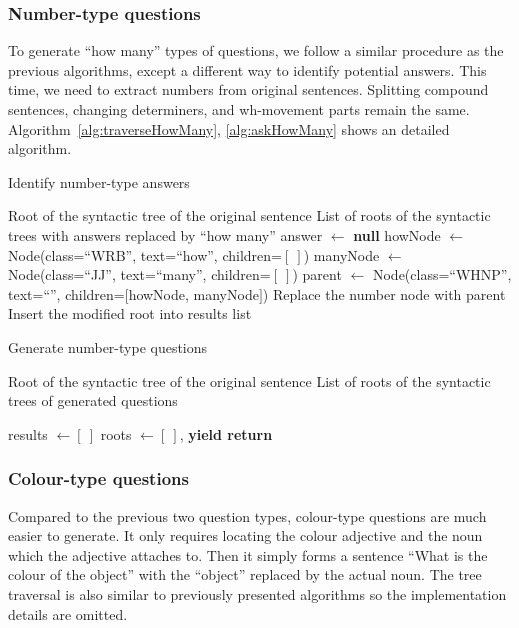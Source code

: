 \subsubsection{Number-type questions}
To generate ``how many'' types of questions, we follow a similar procedure as the previous algorithms, except a different way to identify potential answers. This time, we need to extract numbers from original sentences. Splitting compound sentences, changing determiners, and wh-movement parts remain the same. Algorithm~\ref{alg:traverseHowMany}, \ref{alg:askHowMany} shows an detailed algorithm.

\begin{algorithm}[h]
\caption{Identify number-type answers}
\label{alg:traverseHowMany}
\begin{algorithmic}[1]
\Require Root of the syntactic tree of the original sentence
\Ensure List of roots of the syntactic trees with answers replaced by ``how many''
    \State {}
\EndFor
\State answer $\gets$ \textbf{null}
    \State howNode $\gets$ Node(class=``WRB'', text=``how'', children=$[\ ]$)
    \State manyNode $\gets$ Node(class=``JJ'', text=``many'', children=$[\ ]$)
    \State parent $\gets$ Node(class=``WHNP'', text=``'', children=$[$howNode, manyNode$]$)
    \State Replace the number node with parent
    \State Insert the modified root into results list
\EndIf
\EndProcedure
\end{algorithmic}
\end{algorithm}

\begin{algorithm}[h]
\caption{Generate number-type questions}
\label{alg:askHowMany}
\begin{algorithmic}[1]
\Require Root of the syntactic tree of the original sentence
\Ensure List of roots of the syntactic trees of generated questions

\State results $\gets [\ ]$
\State {}
    \State roots $\gets [\ ]$, 
        \State \textbf{yield return} 
    \EndFor
\EndFor
\EndProcedure
\end{algorithmic}
\end{algorithm}

\subsubsection{Colour-type questions}
Compared to the previous two question types, colour-type questions are much easier to generate. It only requires locating the colour adjective and the noun which the adjective attaches to. Then it simply forms a sentence ``What is the colour of the object'' with the ``object'' replaced by the actual noun. The tree traversal is also similar to previously presented algorithms so the implementation details are omitted.

